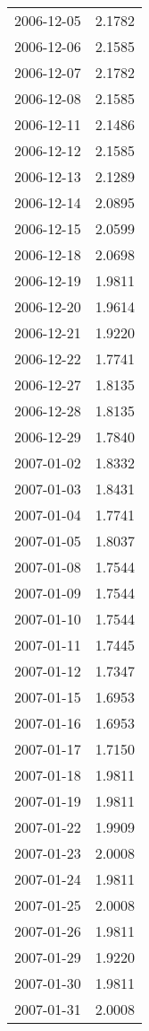 \begin{tabular}{lr}
2006-12-05 &      2.1782 \\
2006-12-06 &      2.1585 \\
2006-12-07 &      2.1782 \\
2006-12-08 &      2.1585 \\
2006-12-11 &      2.1486 \\
2006-12-12 &      2.1585 \\
2006-12-13 &      2.1289 \\
2006-12-14 &      2.0895 \\
2006-12-15 &      2.0599 \\
2006-12-18 &      2.0698 \\
2006-12-19 &      1.9811 \\
2006-12-20 &      1.9614 \\
2006-12-21 &      1.9220 \\
2006-12-22 &      1.7741 \\
2006-12-27 &      1.8135 \\
2006-12-28 &      1.8135 \\
2006-12-29 &      1.7840 \\
2007-01-02 &      1.8332 \\
2007-01-03 &      1.8431 \\
2007-01-04 &      1.7741 \\
2007-01-05 &      1.8037 \\
2007-01-08 &      1.7544 \\
2007-01-09 &      1.7544 \\
2007-01-10 &      1.7544 \\
2007-01-11 &      1.7445 \\
2007-01-12 &      1.7347 \\
2007-01-15 &      1.6953 \\
2007-01-16 &      1.6953 \\
2007-01-17 &      1.7150 \\
2007-01-18 &      1.9811 \\
2007-01-19 &      1.9811 \\
2007-01-22 &      1.9909 \\
2007-01-23 &      2.0008 \\
2007-01-24 &      1.9811 \\
2007-01-25 &      2.0008 \\
2007-01-26 &      1.9811 \\
2007-01-29 &      1.9220 \\
2007-01-30 &      1.9811 \\
2007-01-31 &      2.0008 \\

\end{tabular}
